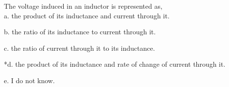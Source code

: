 
The voltage induced in an inductor is represented as,\\

a. the product of its inductance and current through it.

b. the ratio of its inductance to current through it.

c. the ratio of current through it to its inductance.

*d. the product of its inductance and rate of change of current through it.

e. I do not know.\\
